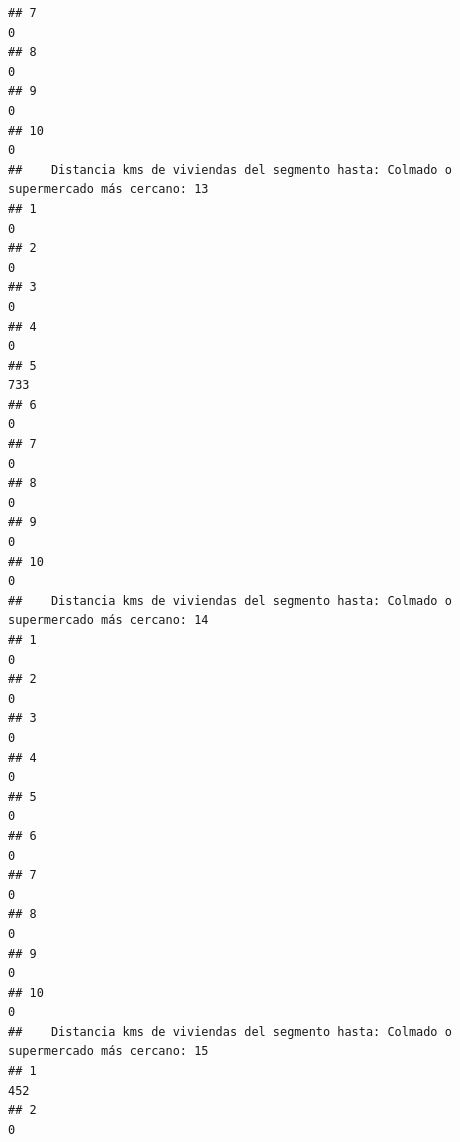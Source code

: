 \documentclass[11pt,]{article}
\begin{document}
\begin{verbatim}
## 7                                                                                      0
## 8                                                                                      0
## 9                                                                                      0
## 10                                                                                     0
##    Distancia kms de viviendas del segmento hasta: Colmado o supermercado más cercano: 13
## 1                                                                                      0
## 2                                                                                      0
## 3                                                                                      0
## 4                                                                                      0
## 5                                                                                    733
## 6                                                                                      0
## 7                                                                                      0
## 8                                                                                      0
## 9                                                                                      0
## 10                                                                                     0
##    Distancia kms de viviendas del segmento hasta: Colmado o supermercado más cercano: 14
## 1                                                                                      0
## 2                                                                                      0
## 3                                                                                      0
## 4                                                                                      0
## 5                                                                                      0
## 6                                                                                      0
## 7                                                                                      0
## 8                                                                                      0
## 9                                                                                      0
## 10                                                                                     0
##    Distancia kms de viviendas del segmento hasta: Colmado o supermercado más cercano: 15
## 1                                                                                    452
## 2                                                                                      0

\end{verbatim}
\end{document}
